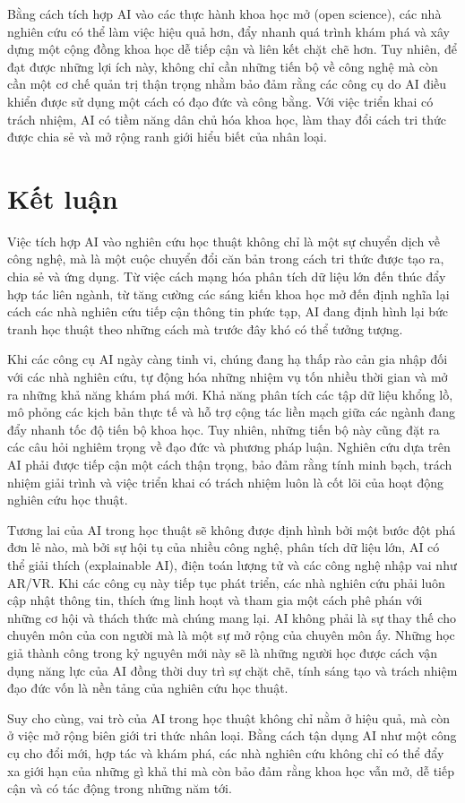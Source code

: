 Bằng cách tích hợp AI vào các thực hành khoa học mở (open science), các nhà nghiên cứu có thể làm việc hiệu quả hơn, đẩy nhanh quá trình khám phá và xây dựng một cộng đồng khoa học dễ tiếp cận và liên kết chặt chẽ hơn. Tuy nhiên, để đạt được những lợi ích này, không chỉ cần những tiến bộ về công nghệ mà còn cần một cơ chế quản trị thận trọng nhằm bảo đảm rằng các công cụ do AI điều khiển được sử dụng một cách có đạo đức và công bằng. Với việc triển khai có trách nhiệm, AI có tiềm năng dân chủ hóa khoa học, làm thay đổi cách tri thức được chia sẻ và mở rộng ranh giới hiểu biết của nhân loại.

\section{Kết luận}

Việc tích hợp AI vào nghiên cứu học thuật không chỉ là một sự chuyển dịch về công nghệ, mà là một cuộc chuyển đổi căn bản trong cách tri thức được tạo ra, chia sẻ và ứng dụng. Từ việc cách mạng hóa phân tích dữ liệu lớn đến thúc đẩy hợp tác liên ngành, từ tăng cường các sáng kiến khoa học mở đến định nghĩa lại cách các nhà nghiên cứu tiếp cận thông tin phức tạp, AI đang định hình lại bức tranh học thuật theo những cách mà trước đây khó có thể tưởng tượng.

Khi các công cụ AI ngày càng tinh vi, chúng đang hạ thấp rào cản gia nhập đối với các nhà nghiên cứu, tự động hóa những nhiệm vụ tốn nhiều thời gian và mở ra những khả năng khám phá mới. Khả năng phân tích các tập dữ liệu khổng lồ, mô phỏng các kịch bản thực tế và hỗ trợ cộng tác liền mạch giữa các ngành đang đẩy nhanh tốc độ tiến bộ khoa học. Tuy nhiên, những tiến bộ này cũng đặt ra các câu hỏi nghiêm trọng về đạo đức và phương pháp luận. Nghiên cứu dựa trên AI phải được tiếp cận một cách thận trọng, bảo đảm rằng tính minh bạch, trách nhiệm giải trình và việc triển khai có trách nhiệm luôn là cốt lõi của hoạt động nghiên cứu học thuật.

Tương lai của AI trong học thuật sẽ không được định hình bởi một bước đột phá đơn lẻ nào, mà bởi sự hội tụ của nhiều công nghệ, phân tích dữ liệu lớn, AI có thể giải thích (explainable AI), điện toán lượng tử và các công nghệ nhập vai như AR/VR. Khi các công cụ này tiếp tục phát triển, các nhà nghiên cứu phải luôn cập nhật thông tin, thích ứng linh hoạt và tham gia một cách phê phán với những cơ hội và thách thức mà chúng mang lại. AI không phải là sự thay thế cho chuyên môn của con người mà là một sự mở rộng của chuyên môn ấy. Những học giả thành công trong kỷ nguyên mới này sẽ là những người học được cách vận dụng năng lực của AI đồng thời duy trì sự chặt chẽ, tính sáng tạo và trách nhiệm đạo đức vốn là nền tảng của nghiên cứu học thuật.

Suy cho cùng, vai trò của AI trong học thuật không chỉ nằm ở hiệu quả, mà còn ở việc mở rộng biên giới tri thức nhân loại. Bằng cách tận dụng AI như một công cụ cho đổi mới, hợp tác và khám phá, các nhà nghiên cứu không chỉ có thể đẩy xa giới hạn của những gì khả thi mà còn bảo đảm rằng khoa học vẫn mở, dễ tiếp cận và có tác động trong những năm tới.
